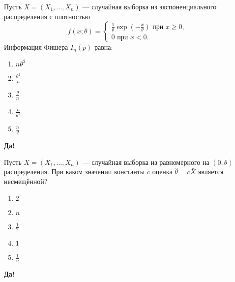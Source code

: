 \documentclass[t]{beamer}
\begin{document}
 \begin{frame} \label{41-Yes} 
\begin{block}{41} 

Пусть $X = (X_1, \ldots , X_n)$ — случайная выборка из экспоненциального распределения с плотностью
\[
f(x; \theta) =
\begin{cases}
\frac{1}{\theta}\exp(-\frac{x}{\theta}) \text{ при } x \geq 0,  \\
0 \text{ при } x < 0.
\end{cases}
\]
Информация Фишера $I_n(p)$ равна:
  


 \end{block} 
\begin{enumerate} 
\item[] \hyperlink{41-No}{\beamergotobutton{} $n \theta^2$}
\item[] \hyperlink{41-No}{\beamergotobutton{} $\frac{\theta^2}{n}$}
\item[] \hyperlink{41-No}{\beamergotobutton{} $\frac{\theta}{n}$}
\item[] \hyperlink{41-Yes}{\beamergotobutton{} $\frac{n}{\theta^2}$}
\item[] \hyperlink{41-No}{\beamergotobutton{} $\frac{n}{\theta}$}
\end{enumerate} 

 \textbf{Да!} 
 \hyperlink{42}{}\end{frame} 


 \begin{frame} \label{42-Yes} 
\begin{block}{42} 

Пусть $X = (X_1, \ldots , X_n)$ — случайная выборка из равномерного на $(0, \theta)$ распределения. При каком значении константы $c$ оценка  $\hat{\theta} = c \bar{X}$ является несмещённой?
  


 \end{block} 
\begin{enumerate} 
\item[] \hyperlink{42-Yes}{\beamergotobutton{} $2$}
\item[] \hyperlink{42-No}{\beamergotobutton{} $n$}
\item[] \hyperlink{42-No}{\beamergotobutton{} $\frac{1}{2}$}
\item[] \hyperlink{42-No}{\beamergotobutton{} $1$}
\item[] \hyperlink{42-No}{\beamergotobutton{} $\frac{1}{n}$}
\end{enumerate} 

 \textbf{Да!} 
 \hyperlink{43}{}\end{frame} 
\end{document}
